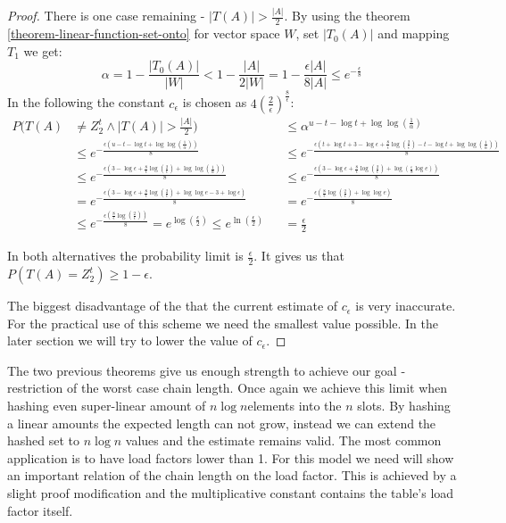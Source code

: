 \begin{proof}
There is one case remaining - $|T(A)| > \frac{|A|}{2}$. By using the theorem \ref{theorem-linear-function-set-onto} for vector space $W$, set $|T_0(A)|$ and mapping $T_1$ we get:
\begin{displaymath}
\alpha = 1 - \frac{|T_0(A)|}{|W|} < 1 - \frac{|A|}{2|W|} = 1 - \frac{\epsilon |A|}{8|A|} \leq e^{-\frac{\epsilon}{8}}
\end{displaymath}
In the following the constant $c_\epsilon$ is chosen as $4\left(\frac{2}{\epsilon}\right)^{\frac{8}{\epsilon}}$:
\begin{align*}
P(T(A) & \neq Z_2^t \wedge |T(A)| > \frac{|A|}{2}) && \leq \alpha ^ {u - t - \log t + \log\log\left(\frac{1}{\alpha}\right)} \\
    & \leq e^{-\frac{\epsilon\left(u - t - \log t + \log\log\left(\frac{1}{\alpha}\right)\right)}{8}} && \leq e^{-\frac{\epsilon\left(t + \log t + 3 - \log \epsilon + \frac{8}{\epsilon}\log\left(\frac{2}{\epsilon}\right) - t - \log t + \log\log\left(\frac{1}{\alpha}\right)\right)}{8}} \\
    & \leq e^{-\frac{\epsilon \left(3 - \log \epsilon + \frac{8}{\epsilon}\log\left(\frac{2}{\epsilon}\right) + \log\log\left(\frac{1}{\alpha}\right) \right)}{8}} && \leq e^{-\frac{\epsilon \left(3 - \log \epsilon + \frac{8}{\epsilon}\log\left(\frac{2}{\epsilon}\right) + \log\left(\frac{\epsilon}{8} \log e \right) \right)}{8}} \\
    & = e^{-\frac{\epsilon \left(3 - \log \epsilon + \frac{8}{\epsilon}\log\left(\frac{2}{\epsilon}\right) + \log\log e - 3 + \log \epsilon \right)}{8}} && = e^{-\frac{\epsilon \left( \frac{8}{\epsilon}\log\left(\frac{2}{\epsilon}\right) + \log\log e \right)}{8}} \\
    & \leq e^{-\frac{\epsilon \left( \frac{8}{\epsilon}\log\left(\frac{2}{\epsilon}\right) \right)}{8}} = e^{{\log\left(\frac{\epsilon}{2}\right)}} \leq e^{\ln\left(\frac{\epsilon}{2}\right)} && = \frac{\epsilon}{2}
\end{align*}

In both alternatives the probability limit is $\frac{\epsilon}{2}$. It gives us that $P(T(A) = Z_2^t) \geq 1 - \epsilon$.

The biggest disadvantage of the that the current estimate of $c_\epsilon$ is very inaccurate. For the practical use of this scheme we need the smallest value possible. In the later section we will try to lower the value of $c_\epsilon$.
\end{proof}

The two previous theorems give us enough strength to achieve our goal - restriction of the worst case chain length. Once again we achieve this limit when hashing even super-linear amount of $n \log n$elements into the $n$ slots. By hashing a linear amounts the expected length can not grow, instead we can extend the hashed set to $n \log n$ values and the estimate remains valid. The most common application is to have load factors lower than 1. For this model we need will show an important relation of the chain length on the load factor. This is achieved by a slight proof modification and the multiplicative constant contains the table's load factor itself.


